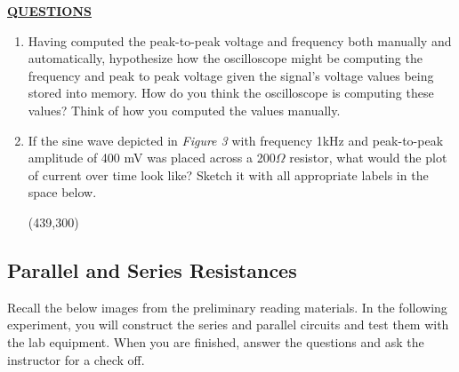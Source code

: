 \documentclass[12pt]{article}
\begin{document}
\textbf{\underline{QUESTIONS}}
\begin{enumerate}
    \item Having computed the peak-to-peak voltage and frequency both manually and automatically, hypothesize how the oscilloscope might be computing the frequency and peak to peak voltage given the signal's voltage values being stored into memory. How do you think the oscilloscope is computing these values? Think of how you computed the values manually.
        \fillwithlines{1in}
    
    \item If the sine wave depicted in \textit{Figure 3} with frequency 1kHz and peak-to-peak amplitude of 400 mV was placed across a 200$\Omega$ resistor, what would the plot of current over time look like? Sketch it with all appropriate labels in the space below.
    
        \framebox(439,300){}
\end{enumerate}

\checkoffsubsub

\subsection{Parallel and Series Resistances}

Recall the below images from the preliminary reading materials. In the following experiment, you will construct the series and parallel circuits and test them with the lab equipment. When you are finished, answer the questions and ask the instructor for a check off.
\end{document}
